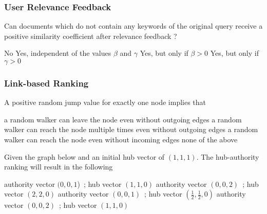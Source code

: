 \documentclass[12pt,a4paper]{exam} %
\begin{document}
\subsubsection{User Relevance Feedback}
\begin{questions}
\question Can documents which do not contain any keywords of the original query receive a positive similarity coefficient after relevance feedback ?
\begin{checkboxes}
\choice No
\choice Yes, independent of the values $\beta$ and $\gamma$
\CorrectChoice Yes, but only if $\beta>0$
\choice Yes, but only if $\gamma>0$
\end{checkboxes}


\subsubsection{Link-based Ranking}
\question A positive random jump value for exactly one node implies that
\begin{checkboxes}
\CorrectChoice a random walker can leave the node even without outgoing edges
\choice a random walker can reach the node multiple times even without outgoing edges
\CorrectChoice a random walker can reach the node even without incoming edges
\choice none of the above
\end{checkboxes}

\question Given the graph below and an initial hub vector of $(1,1,1)$. The hub-authority ranking will result in the following
\begin{checkboxes}
\choice authority vector $(0,0,1$)~; hub vector $(1,1,0)$
\choice authority vector $(0,0,2)$~; hub vector $(2,2,0)$
\CorrectChoice authority vector $(0,0,1)$~; hub vector $(\frac{1}{2},\frac{1}{2},0)$
\choice authority vector $(0,0,2)$~; hub vector $(1,1,0)$
\end{checkboxes}
\end{questions}
\end{document}
